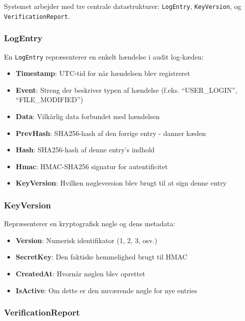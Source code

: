 \documentclass[12pt, a4paper, danish]{article}
\begin{document}
Systemet arbejder med tre centrale datastrukturer: \texttt{LogEntry}, \texttt{KeyVersion}, og \texttt{VerificationReport}.

\subsubsection{LogEntry}

En \texttt{LogEntry} repræsenterer en enkelt hændelse i audit log-kæden:

\begin{itemize}
    \item \textbf{Timestamp}: UTC-tid for når hændelsen blev registreret
    \item \textbf{Event}: Streng der beskriver typen af hændelse (f.eks. ``USER\_LOGIN'', ``FILE\_MODIFIED'')
    \item \textbf{Data}: Vilkårlig data forbundet med hændelsen
    \item \textbf{PrevHash}: SHA256-hash af den forrige entry - danner kæden
    \item \textbf{Hash}: SHA256-hash af denne entry's indhold
    \item \textbf{Hmac}: HMAC-SHA256 signatur for autentificitet
    \item \textbf{KeyVersion}: Hvilken nøgleversion blev brugt til at sign denne entry
\end{itemize}

\subsubsection{KeyVersion}

Repræsenterer en kryptografisk nøgle og dens metadata:

\begin{itemize}
    \item \textbf{Version}: Numerisk identifikator (1, 2, 3, osv.)
    \item \textbf{SecretKey}: Den faktiske hemmelighed brugt til HMAC
    \item \textbf{CreatedAt}: Hvornår nøglen blev oprettet
    \item \textbf{IsActive}: Om dette er den nuværende nøgle for nye entries
\end{itemize}

\subsubsection{VerificationReport}
\end{document}
